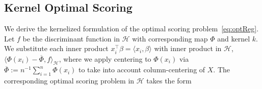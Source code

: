 \documentclass[twoside, onecolumn]{article}
\def\Hcal{\mathcal{H}}
\def\Hcal{\mathcal{H}}
\DeclareMathOperator*{\minimize}{minimize}
\begin{document}




\subsection{Kernel Optimal Scoring}\label{sec:RegKernOptScore}

We derive the kernelized formulation of the optimal scoring problem~\eqref{eq:optReg}. Let $f$ be the discriminant function in $\Hcal$ with corresponding map $\Phi$ and kernel $k$. We substitute each inner product $x_i^{\top}\beta = \langle x_i, \beta \rangle$ with inner product in $\Hcal$, $\langle \Phi(x_i) - \overline{\Phi}, f \rangle_{\Hcal}$, where we apply centering to $\Phi(x_i)$ via $\overline{\Phi}:=n^{-1}\sum_{i=1}^{n}\Phi(x_i)$ to take into account column-centering of $X$. The corresponding optimal scoring problem in $\Hcal$ takes the form

\end{document}
